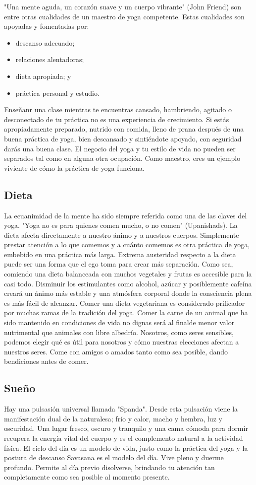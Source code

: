 "Una mente aguda, un corazón suave y un cuerpo vibrante" (John Friend) son entre otras cualidades de un maestro de yoga competente. Estas cualidades son apoyadas y fomentadas por:
\begin{itemize}
	\item descanso adecuado;
	\item relaciones alentadoras;
	\item dieta apropiada; y
	\item práctica personal y estudio.
\end{itemize}

Enseñanr una clase mientras te encuentras cansado, hambriendo, agitado o desconectado de tu práctica no es una experiencia de crecimiento. Si estás apropiadamente preparado, nutrido con comida, lleno de prana después de una buena práctica de yoga, bien descansado y sintiéndote apoyado, con seguridad darás una buena clase. El negocio del yoga y tu estilo de vida no pueden ser separados tal como en alguna otra ocupación. Como maestro, eres un ejemplo viviente de cómo la práctica de yoga funciona.

\subsection{Dieta}
La ecuanimidad de la mente ha sido siempre referida como una de las claves del yoga. "Yoga no es para quienes comen mucho, o no comen" (Upanishads). La dieta afecta directamente a nuestro ánimo y a nuestros cuerpos. Simplemente prestar atención a lo que comemos y a cuánto comemos es otra práctica de yoga, embebido en una práctica más larga. Extrema austeridad respecto a la dieta puede ser una forma que el ego toma para crear más separación. Como sea, comiendo una dieta balanceada con muchos vegetales y frutas es accesible para la casi todo. Disminuir los estimulantes como alcohol, azúcar y posiblemente cafeína creará un ánimo más estable y una atmósfera corporal donde la consciencia plena es más fácil de alcanzar. Comer una dieta vegetariana es considerado prificador por muchas ramas de la tradición del yoga. Comer la carne de un animal que ha sido mantenido en condiciones de vida no dignas será al finalde menor valor nutrimental que animales con libre albedrío. Nosotros, como seres sensibles, podemos elegir qué es útil para nosotros y cómo nuestras elecciones afectan a nuestros seres. Come con amigos o amados tanto como sea posible, dando bendiciones antes de comer.

\subsection{Sueño}
Hay una pulsasión universal llamada "Spanda". Desde esta pulsación viene la manifestación dual de la naturalesa; frío y calor, macho y hembra, luz y oscuridad. Una lugar fresco, oscuro y tranquilo y una cama cómoda para dormir recupera la energía vital del cuerpo y es el complemento natural a la actividad física. El ciclo del día es un modelo de vida, justo como la práctica del yoga y la postura de descanso Savasana es el modelo del día. Vive pleno y duerme profundo. Permite al día previo disolverse, brindando tu atención tan completamente como sea posible al momento presente.

